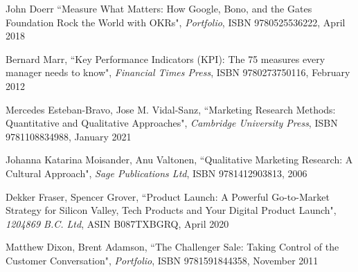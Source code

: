 \begin{thebibliography}{100}
 John Doerr  ``Measure What Matters: How Google, Bono, and the Gates Foundation Rock the World
with OKRs", \emph{Portfolio}, ISBN 9780525536222, April 2018

 Bernard Marr, ``Key Performance Indicators (KPI): The 75 measures every manager needs to know",
\emph{Financial Times Press}, ISBN 9780273750116, February 2012

 Mercedes Esteban-Bravo, Jose M. Vidal-Sanz, ``Marketing Research Methods: Quantitative and 
Qualitative Approaches", \emph{Cambridge University Press}, ISBN 9781108834988, January 2021

 Johanna Katarina Moisander, Anu Valtonen, ``Qualitative Marketing Research: A 
Cultural Approach", \emph{Sage Publications Ltd}, ISBN 9781412903813, 2006

 Dekker Fraser, Spencer Grover, ``Product Launch: A Powerful Go-to-Market Strategy for Silicon 
Valley, Tech Products and Your Digital Product Launch", \emph{1204869 B.C. Ltd}, ASIN B087TXBGRQ, April 2020

 Matthew Dixon, Brent Adamson, ``The Challenger Sale: Taking Control of the Customer 
Conversation", \emph{Portfolio}, ISBN 9781591844358, November 2011 


\end{thebibliography}
